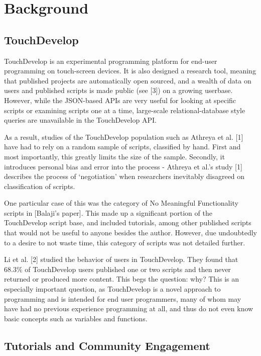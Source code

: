 \section{Background}



\subsection{TouchDevelop}

TouchDevelop is an experimental programming platform for end-user programming on touch-screen devices. It is also designed a research tool, meaning that published projects are automatically open sourced, and a wealth of data on users and published scripts is made public (see [3]) on a growing userbase. However, while the JSON-based APIs are very useful for looking at specific scripts or examining scripts one at a time, large-scale relational-database style queries are unavailable in the TouchDevelop API.

As a result, studies of the TouchDevelop population such as Athreya et al. [1] have had to rely on a random sample of scripts, classified by hand. First and most importantly, this greatly limits the size of the sample. Secondly, it introduces personal bias and error into the process - Athreya et al.’s study [1] describes the process of ‘negotiation’ when researchers inevitably disagreed on classification of scripts.

One particular case of this was the category of No Meaningful Functionality scripts in [Balaji’s paper]. This made up a significant portion of the TouchDevelop script base, and included tutorials, among other published scripts that would not be useful to anyone besides the author. However, due undoubtedly to a desire to not waste time, this category of scripts was not detailed further.

Li et al. [2] studied the behavior of users in TouchDevelop. They found that 68.3\% of TouchDevelop users published one or two scripts and then never returned or produced more content. This begs the question: why? This is an especially important question, as TouchDevelop is a novel approach to programming and is intended for end user programmers, many of whom may have had no previous experience programming at all, and thus do not even know basic concepts such as variables and functions.

\subsection{Tutorials and Community Engagement}

